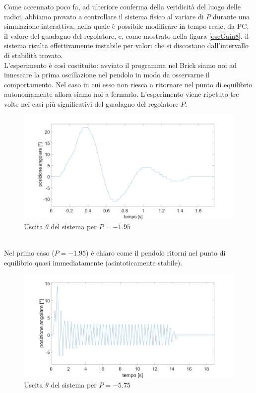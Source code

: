 Come accennato poco fa, ad ulteriore conferma della veridicità del luogo delle radici, abbiamo provato a controllare il sistema fisico al variare di $P$ durante una simulazione interattiva, nella quale è possibile modificare in tempo reale, da PC, il valore del guadagno del regolatore, e, come mostrato nella figura \ref{oscGain8}, il sistema risulta effettivamente instabile per valori che si discostano dall'intervallo di stabilità trovato.\\
L'esperimento è così costituito: avviato il programma nel Brick siamo noi ad innescare la prima oscillazione nel pendolo in modo da osservarne il comportamento. Nel caso in cui esso non riesca a ritornare nel punto di equilibrio autonomamente allora siamo noi a fermarlo.
L'esperimento viene ripetuto tre volte nei casi più significativi del guadagno del regolatore $P$.
\begin{figure}[ht]
	\centering
	\includegraphics[scale=0.27]{oscGain1_95.png}
	\caption{Uscita $\theta$ del sistema per  $P=-1.95$}
	\label{variazioneGainP}
\end{figure}
\\Nel primo caso  ($P=-1.95$) è chiaro come il pendolo ritorni nel punto di equilibrio quasi immediatamente (asintoticamente stabile).
\begin{figure}[ht]
	\centering
	\includegraphics[scale=0.27]{oscGain5_75.png}
	\caption{Uscita $\theta$ del sistema per $P=-5.75$}
	\label{oscGain5_75}
\end{figure}
